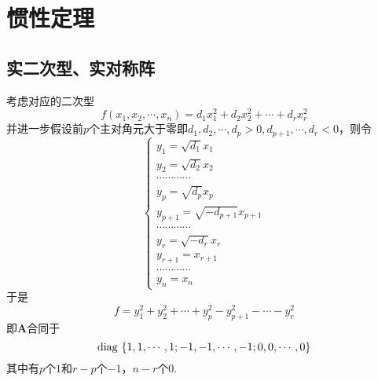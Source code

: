 \newpage
\section{惯性定理}
\subsection{实二次型、实对称阵}
考虑对应的二次型\[
    f\left(
    x_1,x_2,\cdots,x_n
    \right)=d_1x_1^2+d_2x_2^2+\cdots+d_rx_r^2
\]并进一步假设前$p$个主对角元大于零即$d_1,d_2,\cdots,d_p>0,d_{p+1},\cdots,d_r<0$，则令\[
    \begin{cases*}
        y_1=\sqrt{d_1}x_1              \\
        y_2=\sqrt{d_2}x_2              \\
        \cdots\cdots\cdots\cdots       \\
        y_p=\sqrt{d_p}x_p              \\
        y_{p+1}=\sqrt{-d_{p+1}}x_{p+1} \\
        \cdots\cdots\cdots\cdots       \\
        y_r=\sqrt{-d_r}x_r             \\
        y_{r+1}=x_{r+1}                \\
        \cdots\cdots\cdots\cdots       \\
        y_n=x_n
    \end{cases*}
\]于是\[
    f=y_1^2+y_2^2+\cdots+y_p^2-y_{p+1}^2-\cdots-y_r^2
\]即$\bm{A}$合同于\[
    \operatorname{diag\,} \left\{
    1,1,\cdots,1;-1,-1,\cdots,-1;0,0,\cdots,0
    \right\}
\]其中有$p$个$1$和$r-p$个$-1$，$n-r$个$0$.
